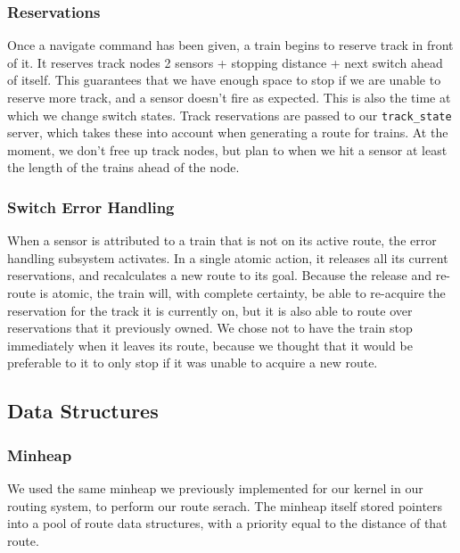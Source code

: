 \documentclass{article}
\begin{document}
\subsubsection{Reservations}

Once a navigate command has been given, a train begins to reserve track in front of it. It reserves track nodes 2 sensors + stopping distance + next switch ahead of itself.
This guarantees that we have enough space to stop if we are unable to reserve more track, and a sensor doesn't fire as expected.
This is also the time at which we change switch states. Track reservations are passed to our \verb|track_state| server, which takes these into account when generating a route for trains.
At the moment, we don't free up track nodes, but plan to when we hit a sensor at least the length of the trains ahead of the node.

\subsubsection{Switch Error Handling}
When a sensor is attributed to a train that is not on its active route, the error handling subsystem activates. In a single atomic action, it releases all its current reservations, and recalculates a new route to its goal. 
Because the release and re-route is atomic, the train will, with complete certainty, be able to re-acquire the reservation for the track it is currently on, but it is also able to route over reservations that it previously owned. %
We chose not to have the train stop immediately when it leaves its route, because we thought that it would be preferable to it to only stop if it was unable to acquire a new route. 

\subsection{Data Structures}
\subsubsection{Minheap}
    We used the same minheap we previously implemented for our kernel in our routing system, to perform our route serach. The minheap itself stored pointers into a pool of route data structures, with a priority equal to the distance of that route. 
\end{document}
